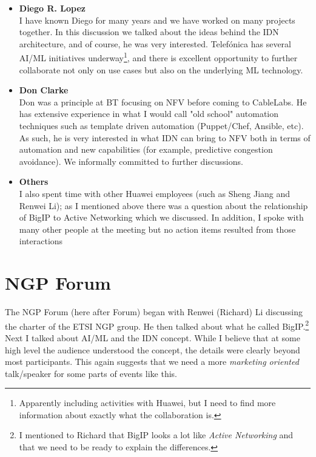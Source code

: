 \documentclass[11pt, oneside]{article}   	%
\begin{document}
\begin{itemize}
\item \textbf{Diego R. Lopez} \\
I have known Diego for many years and we have worked on many projects together. In this discussion we talked
about the ideas behind the IDN architecture, and of course, he was very interested. Telef\'onica has several AI/ML 
initiatives underway\footnote{Apparently including activities with Huawei, but I need to find more information about
exactly what the collaboration is.}, and there is excellent opportunity to further collaborate not only on use cases but
also on the underlying ML technology.

\item \textbf{Don Clarke} \\
Don was a principle at BT focusing on NFV before coming to CableLabs. He has extensive experience in what I would call "old school" automation techniques such as template driven automation (Puppet/Chef, Ansible, etc).  As such, he is very interested in what IDN can bring to NFV both in terms of automation and new capabilities (for example, predictive congestion avoidance).  We informally committed to further discussions. 

\item \textbf{Others} \\
I also spent time with other Huawei employees (such as Sheng Jiang and Renwei Li); as I mentioned above there was a question about the
relationship of BigIP to Active Networking which we discussed. In addition, I spoke with many other people at the meeting but no action items resulted from those interactions
\end{itemize}

\section{NGP Forum} 
\label{sec:ngp_forum}
The NGP Forum (here after Forum) began with Renwei (Richard) Li discussing the charter of the ETSI NGP group. He then talked about what he called BigIP.\footnote{I mentioned to Richard that BigIP looks a lot like \emph{Active Networking} \cite{Tennenhouse:2007:TAN:1290168.1290180} and that we need to be ready to explain the differences.} Next I talked about AI/ML and the IDN concept. While I believe that at some high level the audience understood the concept, the details were clearly beyond most participants. This again suggests that we need a more \emph{marketing oriented} talk/speaker for some parts of events like this. 
\end{document}
